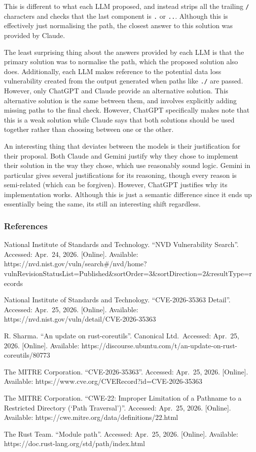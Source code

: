 This is different to what each LLM proposed, and instead strips all the
trailing \texttt{/} characters and checks that the last component is
\texttt{.} or \texttt{..}. Although this is effectively just normalising
the path, the closest answer to this solution was provided by Claude.

The least surprising thing about the answers provided by each LLM is
that the primary solution was to normalise the path, which the proposed
solution also does. Additionally, each LLM makes reference to the
potential data loss vulnerability created from the output generated when
paths like \texttt{./} are passed. However, only ChatGPT and Claude
provide an alternative solution. This alternative solution is the same
between them, and involves explicitly adding missing paths to the final
check. However, ChatGPT specifically makes note that this is a weak
solution while Claude says that both solutions should be used together
rather than choosing between one or the other.

An interesting thing that deviates between the models is their
justification for their proposal. Both Claude and Gemini justify why
they chose to implement their solution in the way they chose, which use
reasonably sound logic. Gemini in particular gives several
justifications for its reasoning, though every reason is semi-related
(which can be forgiven). However, ChatGPT justifies why its
implementation works. Although this is just a semantic difference since
it ends up essentially being the same, its still an interesting shift
regardless.

\hypertarget{references}{%
\subsubsection{References}\label{references}}

National Institute of Standards and Technology. ``NVD Vulnerability
Search''. Accessed: Apr.~24, 2026. {[}Online{]}. Available:
https://nvd.nist.gov/vuln/search\#/nvd/home?vulnRevisionStatusList=Published\&sortOrder=3\&sortDirection=2\&resultType=records

National Institute of Standards and Technology. ``CVE-2026-35363
Detail''. Accessed: Apr.~25, 2026. {[}Online{]}. Available:
https://nvd.nist.gov/vuln/detail/CVE-2026-35363

R. Sharma. ``An update on rust-coreutils''. Canonical Ltd.~Accessed:
Apr.~25, 2026. {[}Online{]}. Available:
https://discourse.ubuntu.com/t/an-update-on-rust-coreutils/80773

The MITRE Corporation. ``CVE-2026-35363''. Accessed: Apr.~25, 2026.
{[}Online{]}. Available: https://www.cve.org/CVERecord?id=CVE-2026-35363

The MITRE Corporation. ``CWE-22: Improper Limitation of a Pathname to a
Restricted Directory (`Path Traversal')''. Accessed: Apr.~25, 2026.
{[}Online{]}. Available: https://cwe.mitre.org/data/definitions/22.html

The Rust Team. ``Module path''. Accessed: Apr.~25, 2026. {[}Online{]}.
Available: https://doc.rust-lang.org/std/path/index.html
